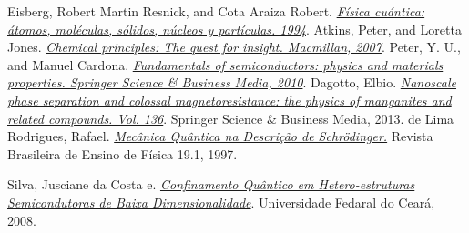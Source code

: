  Eisberg, Robert Martin Resnick, and Cota Araiza Robert. \href{http://gen.lib.rus.ec/book/index.php?md5=80CCC290E6FFF645ADF0BA24178E4C5D}\textit{Física cuántica: átomos, moléculas, sólidos, núcleos y partículas. 1994}.
  Atkins, Peter, and Loretta Jones. \href{http://gen.lib.rus.ec/book/index.php?md5=6D32E94CECA0A9BD6FFF5F1307078071}\textit{Chemical principles: The quest for insight. Macmillan, 2007}.
  Peter, Y. U., and Manuel Cardona. \href{http://gen.lib.rus.ec/book/index.php?md5=20A8507AB491C812ED2C75D08740987A}\textit{Fundamentals of semiconductors: physics and materials properties. Springer Science \& Business Media, 2010}.
  Dagotto, Elbio. \href{http://gen.lib.rus.ec/book/index.php?md5=3C621FEBFE1EBBF8B376CED188D04A84}\textit{Nanoscale phase separation and colossal magnetoresistance: the physics of manganites and related compounds. Vol. 136}. Springer Science \& Business Media, 2013.
  de Lima Rodrigues, Rafael. \href{http://sbfisica.org.br/rbef/pdf/v19_68.pdf}\textit{Mecânica Quântica na Descrição de Schrödinger.} Revista Brasileira de Ensino de Física 19.1, 1997.

  Silva, Jusciane da Costa e. \href{www.repositorio.ufc.br/bitstream/riufc/12669/1/2008_tese_jcsilva.pdf}\textit{Confinamento Quântico em Hetero-estruturas Semicondutoras de Baixa Dimensionalidade}. Universidade Fedaral do Ceará, 2008.